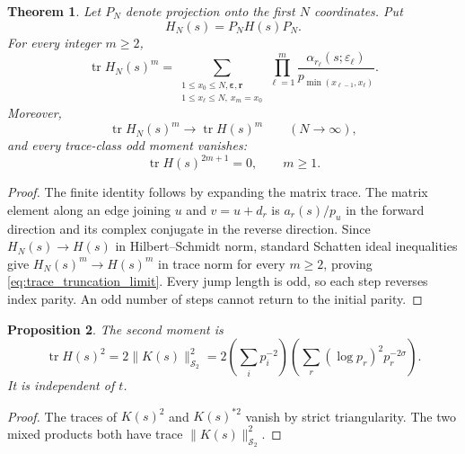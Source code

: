 \documentclass[11pt]{amsart}
\numberwithin{equation}{section}
\theoremstyle{plain}
\newtheorem{theorem}{Theorem}[section]
\newtheorem{proposition}[theorem]{Proposition}
\theoremstyle{definition}
\theoremstyle{remark}
\newcommand{\HS}{\mathcal S_2}
\newcommand{\tr}{\operatorname{tr}}
\begin{document}
\begin{theorem}
\label{thm:exact_closed_walk_trace}
Let $P_N$ denote projection onto the first $N$ coordinates.  Put
\begin{equation}
H_N(s)=P_NH(s)P_N.
\label{eq:H_finite_truncation}
\end{equation}
For every integer $m\ge2$,
\begin{equation}
\tr H_N(s)^m
=
\sum_{\substack{1\le x_0\le N,\boldsymbol\varepsilon,\mathbf r\\
1\le x_\ell\le N,\ x_m=x_0}}
\prod_{\ell=1}^{m}
\frac{\alpha_{r_\ell}(s;\varepsilon_\ell)}
{p_{\min(x_{\ell-1},x_\ell)}}.
\label{eq:exact_closed_walk_trace}
\end{equation}
Moreover,
\begin{equation}
\tr H_N(s)^m\longrightarrow \tr H(s)^m
\qquad (N\to\infty),
\label{eq:trace_truncation_limit}
\end{equation}
and every trace-class odd moment vanishes:
\begin{equation}
\tr H(s)^{2m+1}=0,\qquad m\ge1.
\label{eq:odd_moments_vanish}
\end{equation}
\end{theorem}

\begin{proof}
The finite identity follows by expanding the matrix trace.  The matrix element along an edge joining $u$ and $v=u+d_r$ is $a_r(s)/p_u$ in the forward direction and its complex conjugate in the reverse direction.  Since $H_N(s)\to H(s)$ in Hilbert--Schmidt norm, standard Schatten ideal inequalities give $H_N(s)^m\to H(s)^m$ in trace norm for every $m\ge2$, proving \eqref{eq:trace_truncation_limit}.  Every jump length is odd, so each step reverses index parity.  An odd number of steps cannot return to the initial parity.
\end{proof}

\begin{proposition}
\label{prop:second_moment}
The second moment is
\begin{equation}
\tr H(s)^2
=2\|K(s)\|_{\HS}^2
=2\left(\sum_i p_i^{-2}\right)
\left(\sum_r(\log p_r)^2p_r^{-2\sigma}\right).
\label{eq:H_second_moment}
\end{equation}
It is independent of $t$.
\end{proposition}

\begin{proof}
The traces of $K(s)^2$ and $K(s)^{*2}$ vanish by strict triangularity.  The two mixed products both have trace $\|K(s)\|_{\HS}^2$.
\end{proof}
\end{document}
